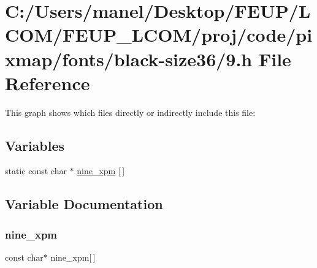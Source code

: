 \hypertarget{black-size36_29_8h}{}\section{C\+:/\+Users/manel/\+Desktop/\+F\+E\+U\+P/\+L\+C\+O\+M/\+F\+E\+U\+P\+\_\+\+L\+C\+O\+M/proj/code/pixmap/fonts/black-\/size36/9.h File Reference}
\label{black-size36_29_8h}
This graph shows which files directly or indirectly include this file\+:
\subsection*{Variables}
\begin{DoxyCompactItemize}
\item 
static const char $\ast$ \mbox{\hyperlink{black-size36_29_8h_a463710ef8e20e62ca79425f24079db70}{nine\+\_\+xpm}} \mbox{[}$\,$\mbox{]}
\end{DoxyCompactItemize}


\subsection{Variable Documentation}
\mbox{\label{black-size36_29_8h_a463710ef8e20e62ca79425f24079db70}} 
\subsubsection{\texorpdfstring{nine\_xpm}{nine\_xpm}}
{\footnotesize\ttfamily const char$\ast$ nine\+\_\+xpm\mbox{[}$\,$\mbox{]}\hspace{0.3cm}{\ttfamily [static]}}

